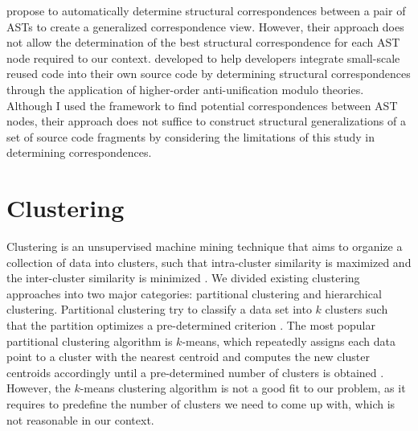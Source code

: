 \citet{2007:esec_fse:cottrell} propose  to automatically determine structural correspondences between a pair of ASTs to create a generalized correspondence view. However, their approach does not allow the determination of the best structural correspondence for each AST node required to our context. \citet{2008:fse:cottrell} developed  to help developers integrate small-scale reused code into their own source code by determining structural correspondences through the application of higher-order anti-unification modulo theories. Although I used the  framework to find potential correspondences between AST nodes, their approach does not suffice to construct structural generalizations of a set of source code fragments by considering the limitations of this study in determining correspondences.


\section{Clustering}  \label{ch7-clustering}

Clustering is an unsupervised machine mining technique that aims to organize a collection of data into clusters, such that intra-cluster similarity is maximized and the inter-cluster similarity is minimized \cite{karypis1999chameleon,grira2004unsupervised}. We divided existing clustering approaches into two major categories: partitional clustering and hierarchical clustering. Partitional clustering try to classify a data set into $k$ clusters such that the partition optimizes a pre-determined criterion \cite{karypis1999chameleon}. The most popular partitional clustering algorithm is $k$-means, which repeatedly assigns each data point to a cluster with the nearest centroid and computes the new cluster centroids accordingly until a pre-determined number of clusters is obtained \cite{bouguettaya2015efficient}. However, the $k$-means clustering algorithm is not a good fit to our problem, as it requires to predefine the number of clusters we need to come up with, which is not reasonable in our context. %

